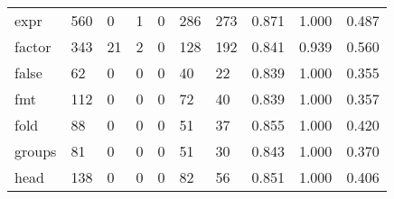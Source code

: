 \begin{longtable}{lp{1.3cm}p{1.3cm}p{1.3cm}p{1.3cm}p{1.3cm}p{1.3cm}p{1.3cm}p{1.3cm}p{1.3cm}}
expr      &                    560 &                                             0 &                                            1 &                                           0 &                                          286 &                                        273 &                                0.871 &                                  1.000 &                                0.487 \\
factor    &                    343 &                                            21 &                                            2 &                                           0 &                                          128 &                                        192 &                                0.841 &                                  0.939 &                                0.560 \\
false     &                     62 &                                             0 &                                            0 &                                           0 &                                           40 &                                         22 &                                0.839 &                                  1.000 &                                0.355 \\
fmt       &                    112 &                                             0 &                                            0 &                                           0 &                                           72 &                                         40 &                                0.839 &                                  1.000 &                                0.357 \\
fold      &                     88 &                                             0 &                                            0 &                                           0 &                                           51 &                                         37 &                                0.855 &                                  1.000 &                                0.420 \\
groups    &                     81 &                                             0 &                                            0 &                                           0 &                                           51 &                                         30 &                                0.843 &                                  1.000 &                                0.370 \\
head      &                    138 &                                             0 &                                            0 &                                           0 &                                           82 &                                         56 &                                0.851 &                                  1.000 &                                0.406 \\

\end{longtable}
